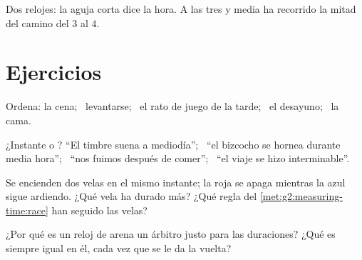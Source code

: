 \begin{omfigure}

{\small Dos relojes: la aguja corta dice la hora. A las tres y media
ha recorrido la mitad del camino del $3$ al $4$.}
\end{omfigure}

\section{Ejercicios}

\begin{exercise}[$\star$]\label{exo:g2:measuring-time:1}
Ordena: la cena; \ levantarse; \ el rato de juego de la tarde; \ el
desayuno; \ la cama.
\end{exercise}

\begin{exercise}[$\star$]\label{exo:g2:measuring-time:2}
¿Instante o ? ``El timbre suena a mediodía''; \ ``el
bizcocho se hornea durante media hora''; \ ``nos fuimos después de
comer''; \ ``el viaje se hizo interminable''.
\end{exercise}

\begin{exercise}[$\star$]\label{exo:g2:measuring-time:3}
Se encienden dos velas en el mismo instante; la roja se apaga mientras
la azul sigue ardiendo. ¿Qué vela ha durado más? ¿Qué regla del
\cref{met:g2:measuring-time:race} han seguido las velas?
\end{exercise}

\begin{exercise}[$\star$]\label{exo:g2:measuring-time:4}
¿Por qué es un reloj de arena un árbitro justo para las duraciones?
¿Qué es siempre igual en él, cada vez que se le da la vuelta?
\end{exercise}


